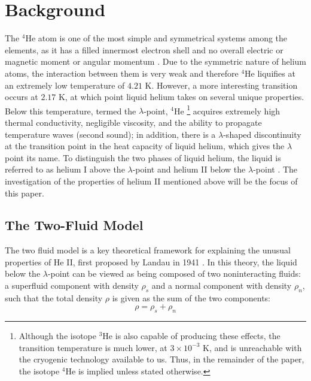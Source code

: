 
\section{Background}\label{background}

The $^4$He atom is one of the most simple and symmetrical systems
among the elements, as it has a filled innermost electron shell and no
overall electric or magnetic moment or angular momentum
\cite{atkins}. Due to the symmetric nature of helium atoms, the
interaction between them is very weak and therefore $^4$He liquifies
at an extremely low temperature of $4.21$ K. However, a more
interesting transition occurs at $2.17$ K, at which point liquid
helium takes on several unique properties. Below this temperature,
termed the $\lambda$-point, $^4$He \footnote{Although the isotope
  $^3$He is also capable of producing these effects, the transition
  temperature is much lower, at $3\times 10^{-3}$ K, and is
  unreachable with the cryogenic technology available to us. Thus, in
  the remainder of the paper, the isotope $^4$He is implied unless
  stated otherwise.}  acquires extremely high thermal conductivity,
negligible viscosity, and the ability to propagate temperature waves
(second sound); in addition, there is a $\lambda$-shaped discontinuity
at the transition point in the heat capacity of liquid helium, which
gives the $\lambda$ point its name. To distinguish the two phases of
liquid helium, the liquid is referred to as helium I above the
$\lambda$-point and helium II below the $\lambda$-point
\cite{tilley}. The investigation of the properties of helium II
mentioned above will be the focus of this paper.

\subsection{The Two-Fluid Model}\label{thetwofluidmodel}

The two fluid model is a key theoretical framework for explaining the
unusual properties of He II, first proposed by Landau in 1941
\cite{landau}. In this theory, the liquid below the $\lambda$-point
can be viewed as being composed of two noninteracting fluids: a
superfluid component with density $\rho_s$ and a normal component with
density $\rho_n$, such that the total density $\rho$ is given as the
sum of the two components:
\begin{equation}
\rho = \rho_s + \rho_n
\label{eqn:density}
\end{equation}


